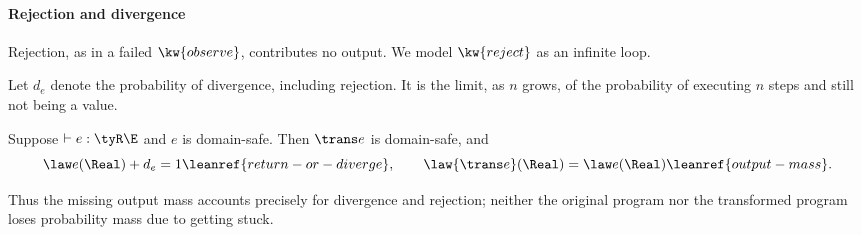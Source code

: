 \paragraph{Rejection and divergence}
Rejection, as in a failed $\kw{observe}$, contributes no output.
We model $\kw{reject}$ as an infinite loop.

Let $d_e$ denote the probability of divergence, including rejection. It is the
limit, as $n$ grows, of the probability of executing $n$ steps and still not
being a value.

\begin{proposition}
\label{prop:probability}
Suppose $\vdash e:\tyR\E$ and $e$ is domain-safe. Then $\trans e$ is domain-safe,
and
\[
 \law e(\Real)+d_e=1\leanref{return-or-diverge},
 \qquad
 \law{\trans e}(\Real)=\law e(\Real)\leanref{output-mass}.
\]
\end{proposition}

Thus the missing output mass accounts precisely for divergence and rejection;
neither the original program nor the transformed program loses probability mass due to getting stuck.
